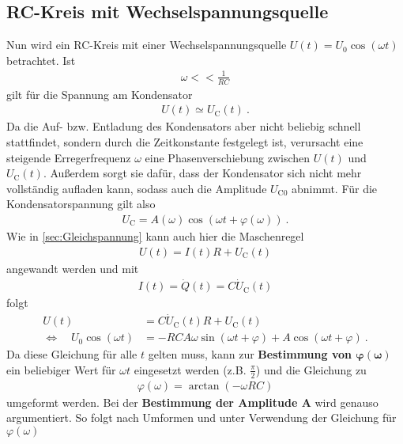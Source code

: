 \subsection{RC-Kreis mit Wechselspannungsquelle}
Nun wird ein RC-Kreis mit einer Wechselspannungsquelle $U(t) = U_0\cos(\omega t)$ betrachtet. Ist
\begin{align}
	\omega << \frac{1}{RC}
\end{align}
gilt für die Spannung am Kondensator
\begin{align}
	U(t) \simeq U_\text{C}(t) \ .
\end{align}
Da die Auf- bzw. Entladung des Kondensators aber nicht beliebig schnell stattfindet, sondern durch die Zeitkonstante festgelegt ist, verursacht eine steigende Erregerfrequenz $\omega$ eine Phasenverschiebung zwischen $U(t)$ und $U_\text{C}(t)$. Außerdem sorgt sie dafür, dass der Kondensator sich nicht mehr vollständig aufladen kann, sodass auch die Amplitude $U_{\text{C}0}$ abnimmt. Für die Kondensatorspannung gilt also
\begin{align}
	U_\text{C} = A(\omega)\cos(\omega t + \varphi(\omega)) \ .
\end{align}
Wie in \ref{sec:Gleichspannung} kann auch hier die Maschenregel
\begin{align}\label{Maschenregel}
	U(t) = I(t)R + U_\text{C}(t)
\end{align}
angewandt werden und mit
\begin{align}
	I(t) = \dot{Q}(t) = C\dot{U}_\text{C}(t)
\end{align}
folgt
\begin{align}\label{Maschenregel_DGL}
	U(t) &= C\dot{U}_\text{C}(t)R + U_\text{C}(t) \\
	\Leftrightarrow\quad U_0\cos(\omega t) &= -RCA\omega\sin(\omega t + \varphi) + A\cos(\omega t + \varphi) \ .
\end{align}
Da diese Gleichung für alle $t$ gelten muss, kann zur \textbf{Bestimmung von $\bm{\varphi(\omega)}$} ein beliebiger Wert für $\omega t$ eingesetzt werden (z.B. $\frac{\pi}{2}$) und die Gleichung zu
\begin{align}
	\varphi(\omega) = \arctan(-\omega RC)
	\label{eq:phase}
\end{align}
umgeformt werden. Bei der \textbf{Bestimmung der Amplitude $\bm{A}$} wird genauso argumentiert. So folgt nach Umformen und unter Verwendung der Gleichung für $\varphi(\omega)$
